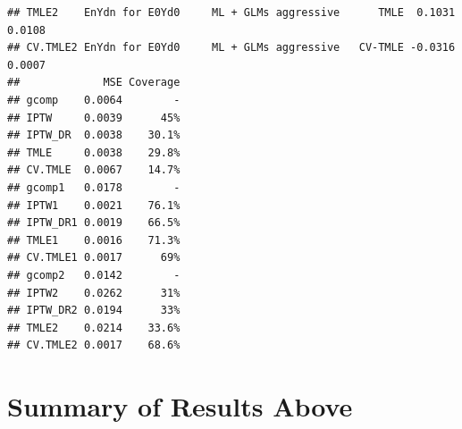 \documentclass[11pt]{article}\usepackage[]{graphicx}\usepackage[]{color}
\makeatletter
\newenvironment{kframe}{%
 \def\at@end@of@kframe{}%
 \ifinner\ifhmode%
  \def\at@end@of@kframe{\end{minipage}}%
  \begin{minipage}{\columnwidth}%
 \fi\fi%
 \def\FrameCommand##1{\hskip\@totalleftmargin \hskip-\fboxsep
 \colorbox{shadecolor}{##1}\hskip-\fboxsep
     \hskip-\linewidth \hskip-\@totalleftmargin \hskip\columnwidth}%
 \MakeFramed {\advance\hsize-\width
   \@totalleftmargin\z@ \linewidth\hsize
   \@setminipage}}%
 {\par\unskip\endMakeFramed%
 \at@end@of@kframe}
\newenvironment{knitrout}{}{} %
\makeatother
\begin{document}
\begin{knitrout}
\begin{kframe}
\begin{verbatim}
## TMLE2    EnYdn for E0Yd0     ML + GLMs aggressive      TMLE  0.1031   0.0108
## CV.TMLE2 EnYdn for E0Yd0     ML + GLMs aggressive   CV-TMLE -0.0316   0.0007
##             MSE Coverage
## gcomp    0.0064        -
## IPTW     0.0039      45%
## IPTW_DR  0.0038    30.1%
## TMLE     0.0038    29.8%
## CV.TMLE  0.0067    14.7%
## gcomp1   0.0178        -
## IPTW1    0.0021    76.1%
## IPTW_DR1 0.0019    66.5%
## TMLE1    0.0016    71.3%
## CV.TMLE1 0.0017      69%
## gcomp2   0.0142        -
## IPTW2    0.0262      31%
## IPTW_DR2 0.0194      33%
## TMLE2    0.0214    33.6%
## CV.TMLE2 0.0017    68.6%
\end{verbatim}
\end{kframe}
\end{knitrout}

\section{Summary of Results Above}
\end{document}
